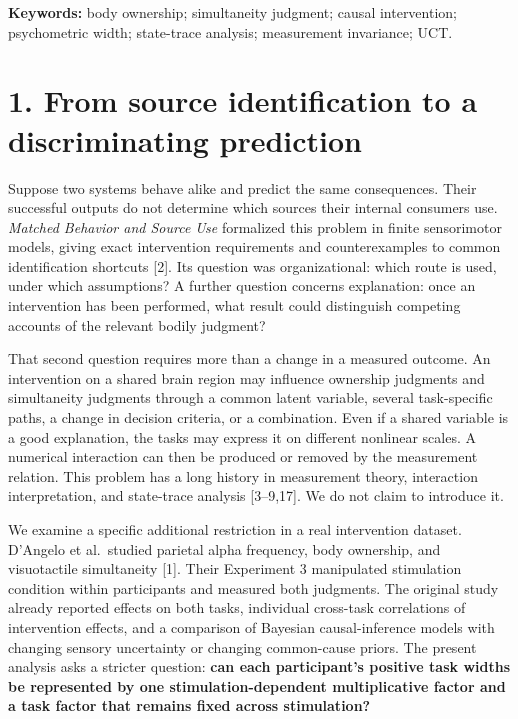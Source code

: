 \documentclass[
  11pt,
]{article}
\let\ctdoldsection\section
\renewcommand{\section}{\Needspace{8\baselineskip}\ctdoldsection}
\begin{document}
\textbf{Keywords:} body ownership; simultaneity judgment; causal
intervention; psychometric width; state-trace analysis; measurement
invariance; UCT.

\hypertarget{from-source-identification-to-a-discriminating-prediction}{%
\section{1. From source identification to a discriminating
prediction}\label{from-source-identification-to-a-discriminating-prediction}}

Suppose two systems behave alike and predict the same consequences.
Their successful outputs do not determine which sources their internal
consumers use. \emph{Matched Behavior and Source Use} formalized this
problem in finite sensorimotor models, giving exact intervention
requirements and counterexamples to common identification shortcuts
{[}2{]}. Its question was organizational: which route is used, under
which assumptions? A further question concerns explanation: once an
intervention has been performed, what result could distinguish competing
accounts of the relevant bodily judgment?

That second question requires more than a change in a measured outcome.
An intervention on a shared brain region may influence ownership
judgments and simultaneity judgments through a common latent variable,
several task-specific paths, a change in decision criteria, or a
combination. Even if a shared variable is a good explanation, the tasks
may express it on different nonlinear scales. A numerical interaction
can then be produced or removed by the measurement relation. This
problem has a long history in measurement theory, interaction
interpretation, and state-trace analysis {[}3--9,17{]}. We do not claim
to introduce it.

We examine a specific additional restriction in a real intervention
dataset. D'Angelo et al.~studied parietal alpha frequency, body
ownership, and visuotactile simultaneity {[}1{]}. Their Experiment 3
manipulated stimulation condition within participants and measured both
judgments. The original study already reported effects on both tasks,
individual cross-task correlations of intervention effects, and a
comparison of Bayesian causal-inference models with changing sensory
uncertainty or changing common-cause priors. The present analysis asks a
stricter question: \textbf{can each participant's positive task widths
be represented by one stimulation-dependent multiplicative factor and a
task factor that remains fixed across stimulation?}
\end{document}
